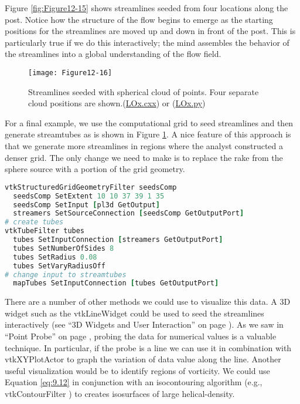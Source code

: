 Figure \ref{fig:Figure12-15} shows streamlines seeded from four locations along the post.
Notice how the structure of the flow begins to emerge as the starting positions for the streamlines are moved up and down in front of the post.
This is particularly true if we do this interactively; the mind assembles the behavior of the streamlines into a global understanding of the flow field.

\begin{figure}[!htb]
	\centering
	\texttt{[image: Figure12-16]}
	\caption{Streamlines seeded with spherical cloud of points. Four separate cloud positions are shown.(\href{https://lorensen.github.io/VTKExamples/site/Cxx/VisualizationAlgorithms/LOx/}{LOx.cxx}) or (\href{https://lorensen.github.io/VTKExamples/site/Python/VisualizationAlgorithms/LOx/}{LOx.py})}
	\label{fig:Figure12-16}
\end{figure}

For a final example, we use the computational grid to seed streamlines and then generate streamtubes as is shown in Figure \ref{fig:Figure12-16}. A nice feature of this approach is that we generate more streamlines in regions where the analyst constructed a denser grid. The only change
we need to make is to replace the rake from the sphere source with a portion of the grid geometry.

\begin{lstlisting}[language=TCL, caption={Use the computational grid to seed streamlines and then generate streamtubes.}]
vtkStructuredGridGeometryFilter seedsComp
  seedsComp SetExtent 10 10 37 39 1 35
  seedsComp SetInput [pl3d GetOutput]
  streamers SetSourceConnection [seedsComp GetOutputPort]
# create tubes
vtkTubeFilter tubes
  tubes SetInputConnection [streamers GetOutputPort]
  tubes SetNumberOfSides 8
  tubes SetRadius 0.08
  tubes SetVaryRadiusOff
# change input to streamtubes
  mapTubes SetInputConnection [tubes GetOutputPort]
\end{lstlisting}

There are a number of other methods we could use to visualize this data.
A 3D widget such as the vtkLineWidget could be used to seed the streamlines interactively (see ``3D Widgets and User Interaction'' on
page \pageref{sec:3D_widgets_user_interaction}). As we saw in ``Point Probe'' on page \pageref{subsec:examples.point_probe}, probing the data
for numerical values is a valuable technique. In particular, if the
probe is a line we can use it in combination with vtkXYPlotActor to
graph the variation of data value along the line. Another useful
visualization would be to identify regions of vorticity. We could use
Equation \ref{eq:9.12} in conjunction with an isocontouring algorithm
(e.g., vtkContourFilter ) to creates isosurfaces of large
helical-density.

